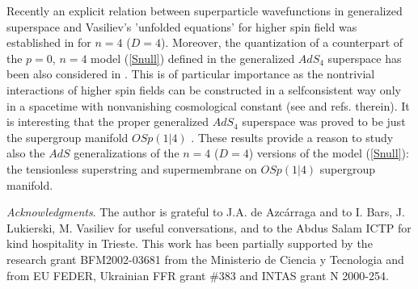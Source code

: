 \documentclass[a4paper,11pt]{article}
\begin{document}
Recently an explicit relation between superparticle wavefunctions 
in generalized superspace and  Vasiliev's 'unfolded equations' 
for higher spin field was established in \cite{Dima} for $n=4$ ($D=4$). 
Moreover, the quantization  
of a counterpart of the $p=0$, $n=4$ model (\ref{Snull})  
defined in the generalized $AdS_4$ superspace 
has been also considered in \cite{Dima}. 
This is of particular importance as the nontrivial interactions 
of higher spin fields can be constructed in a selfconsistent way 
only in a spacetime with nonvanishing cosmological constant 
(see \cite{Vasiliev89} and refs. therein).
It is interesting that the proper generalized $AdS_4$ superspace 
was proved to be just the supergroup manifold $OSp(1|4)$ \cite{Dima,Misha}. 
These results provide a reason to study also 
the $AdS$ generalizations of the $n=4$ ($D=4$) 
versions of the model (\ref{Snull}): the 
tensionless superstring and supermembrane on  $OSp(1|4)$ supergroup manifold. 




\bigskip  



{\it Acknowledgments}. 
The author  is grateful to J.A. de Azc\'arraga and to I. Bars, 
J. Lukierski, M. Vasiliev for useful  
conversations, and to  
the Abdus Salam ICTP for kind hospitality 
in Trieste.  This work has been partially supported by 
the research grant BFM2002-03681 from the Ministerio de Ciencia y 
Tecnologia and from EU FEDER, Ukrainian FFR grant 
$\# 383$ and INTAS grant N 2000-254. 
\end{document}
